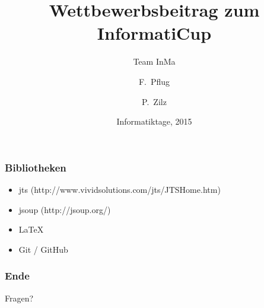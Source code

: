 \documentclass{beamer}
\title[Wettbewerbsbeitrag] %
{Wettbewerbsbeitrag zum InformatiCup}
\subtitle{Team InMa}
\author[Pflug, Zilz] %
{F.~Pflug\inst{1} \and P.~Zilz\inst{2}}
\institute[Leibniz Universität Hannover] %
{
  \inst{1}%
  Fakultät für Elektrotechnik und Informatik\\
  Leibniz Universität Hannover
  \and
  \inst{2}%
  Fakultät für Mathematik und Physik\\
  Leibniz Universität Hannover
}
\date[Informatiktage 2015] %
{Informatiktage, 2015}
\begin{document}
\frame{\titlepage}









\begin{frame}
    \frametitle{Bibliotheken}
    \begin{itemize}
      \item jts (http://www.vividsolutions.com/jts/JTSHome.htm)
      \item jsoup (http://jsoup.org/)
      \item LaTeX
      \item Git / GitHub
    \end{itemize}
\end{frame}

\begin{frame}
    \frametitle{Ende}
    \begin{center}
    \huge{Fragen?}
    \end{center}
\end{frame}


\end{document}
